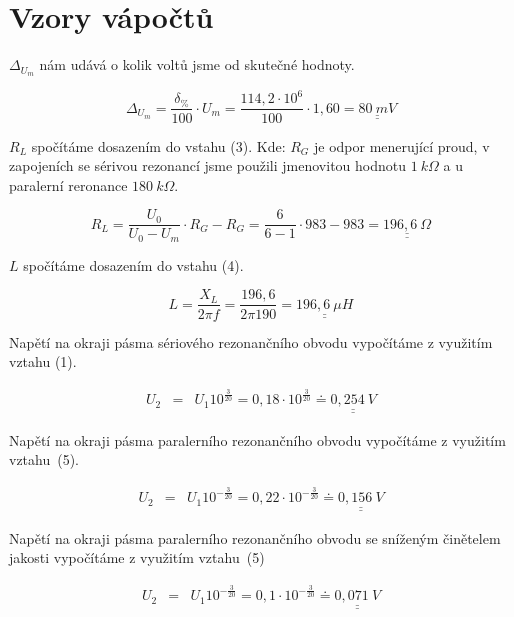 \section{Vzory vápočtů}
  $\Delta_{U_m}$ nám udává o kolik voltů jsme od skutečné hodnoty.
  
  \begin{equation}
    \Delta_{U_m}  = \dfrac{\delta_\%}{100} \cdot U_m = \dfrac{114,2 \cdot 10^6 }{100} \cdot 1,60 = \underline{\underline{80~mV}}
    \nonumber
  \end{equation}
  
  $R_L$ spočítáme dosazením do vstahu (3). Kde: $R_G$ je odpor menerující proud, v zapojeních se sérivou rezonancí jsme použili jmenovitou hodnotu $1~k\Omega$ a u paralerní reronance $180~k\Omega$.
  
  \begin{equation}
    R_L = \dfrac{U_0}{U_0-U_m} \cdot R_G - R_G = \dfrac{6}{6-1} \cdot 983
 - 983 = \underline{\underline{196,6~\Omega}}
    \nonumber
  \end{equation}
  
  $L$ spočítáme dosazením do vstahu (4).
  
  \begin{equation}
    L = \dfrac{X_L}{2\pi f} = \dfrac{196,6}{2\pi 190} = \underline{\underline{196,6~\mu H}}
    \nonumber
  \end{equation}
  
  Napětí na okraji pásma sériového rezonančního obvodu vypočítáme z využitím vztahu (1).

  \begin{eqnarray}
    U_2 &=& U_1 10^{\frac{3}{20}} = 0,18 \cdot 10^{\frac{3}{20}} \doteq \underline{\underline{0,254~V}} \nonumber
  \end{eqnarray}
  
  \newpage Napětí na okraji pásma paralerního rezonančního obvodu vypočítáme z využitím vztahu~(5).

  \begin{eqnarray}
    U_2 &=& U_1 10^{-\frac{3}{20}} = 0,22 \cdot 10^{-\frac{3}{20}} \doteq \underline{\underline{0,156~V}} \nonumber
  \end{eqnarray}
  
  Napětí na okraji pásma paralerního rezonančního obvodu se sníženým činětelem jakosti vypočítáme z využitím vztahu~(5)

  \begin{eqnarray}
    U_2 &=& U_1 10^{-\frac{3}{20}} = 0,1 \cdot 10^{-\frac{3}{20}} \doteq \underline{\underline{0,071~V}} \nonumber
  \end{eqnarray}
